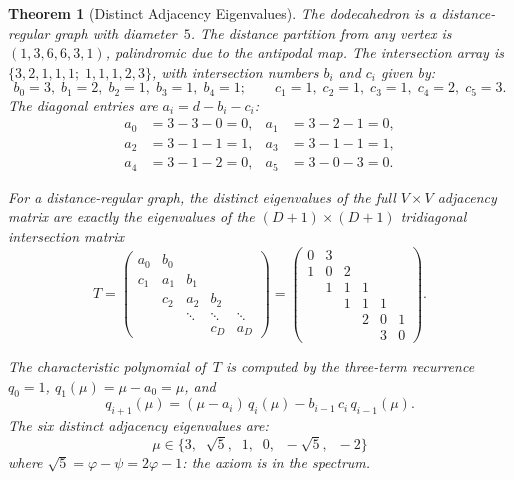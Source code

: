 \documentclass[11pt,a4paper]{article}
\theoremstyle{plain}
\newtheorem{theorem}{Theorem}[section]
\theoremstyle{definition}
\newcommand{\vp}{\varphi}
\newcommand{\ps}{\psi}
\begin{document}
\begin{theorem}[Distinct Adjacency Eigenvalues]\label{thm:adj-eig}
The dodecahedron is a distance-regular graph with diameter~$5$.  The
distance partition from any vertex is $(1, 3, 6, 6, 3, 1)$, palindromic
due to the antipodal map.  The intersection array is
$\{3, 2, 1, 1, 1;\; 1, 1, 1, 2, 3\}$, with intersection numbers
$b_i$ and $c_i$ given by:
\[
  b_0 = 3,\; b_1 = 2,\; b_2 = 1,\; b_3 = 1,\; b_4 = 1;
  \qquad
  c_1 = 1,\; c_2 = 1,\; c_3 = 1,\; c_4 = 2,\; c_5 = 3.
\]
The diagonal entries are $a_i = d - b_i - c_i$:
\begin{align*}
  a_0 &= 3 - 3 - 0 = 0, & a_1 &= 3 - 2 - 1 = 0, \\
  a_2 &= 3 - 1 - 1 = 1, & a_3 &= 3 - 1 - 1 = 1, \\
  a_4 &= 3 - 1 - 2 = 0, & a_5 &= 3 - 0 - 3 = 0.
\end{align*}

For a distance-regular graph, the distinct eigenvalues of the full
$V \times V$ adjacency matrix are exactly the eigenvalues of the
$(D+1) \times (D+1)$ tridiagonal intersection matrix
\[
  T = \begin{pmatrix}
    a_0 & b_0 \\
    c_1 & a_1 & b_1 \\
        & c_2 & a_2 & b_2 \\
        &     & \ddots & \ddots & \ddots \\
        &     &        & c_D & a_D
  \end{pmatrix}
  = \begin{pmatrix}
    0 & 3 & & & & \\
    1 & 0 & 2 & & & \\
      & 1 & 1 & 1 & & \\
      & & 1 & 1 & 1 & \\
      & & & 2 & 0 & 1 \\
      & & & & 3 & 0
  \end{pmatrix}.
\]

The characteristic polynomial of~$T$ is computed by the three-term
recurrence $q_0 = 1$, $q_1(\mu) = \mu - a_0 = \mu$, and
\[
  q_{i+1}(\mu) = (\mu - a_i)\,q_i(\mu) - b_{i-1}\,c_i\,q_{i-1}(\mu).
\]
The six distinct adjacency eigenvalues are:
\[
  \boxed{\;
    \mu \in \{3,\;\; \sqrt{5},\;\; 1,\;\; 0,\;\; -\sqrt{5},\;\; -2\}
  \;}
\]
where $\sqrt{5} = \vp - \ps = 2\vp - 1$: the axiom is in the spectrum.
\end{theorem}
\end{document}

